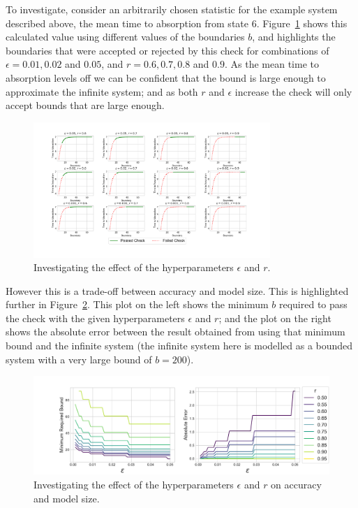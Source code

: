 \documentclass{article}
\begin{document}
To investigate, consider an arbitrarily chosen statistic for the example system
described above, the mean time to absorption from state 6.
Figure~\ref{fig:investigate_hyperparameters} shows this calculated value using
different values of the boundaries $b$, and highlights the boundaries that were
accepted or rejected by this check for combinations of $\epsilon = 0.01, 0.02$
and $0.05$, and $r = 0.6, 0.7, 0.8$ and $0.9$.
As the mean time to absorption levels off we can be confident that the bound is
large enough to approximate the infinite system; and as both $r$ and $\epsilon$
increase the check will only accept bounds that are large enough.

\begin{figure}
  \begin{center}
    \includegraphics[width=0.8\textwidth]{img/check_hyperparameters_effect.pdf}
  \end{center}
  \caption{Investigating the effect of the hyperparameters $\epsilon$ and $r$.}
  \label{fig:investigate_hyperparameters}
\end{figure}

However this is a trade-off between accuracy and model size.
This is highlighted further in Figure~\ref{fig:summary_hyperparameters}.
This plot on the left shows the minimum $b$ required to pass the check with the
given hyperparameters $\epsilon$ and $r$; and the plot on the right shows the
absolute error between the result obtained from using that minimum bound and the
infinite system (the infinite system here is modelled as a bounded system with a
very large bound of $b = 200$).

\begin{figure}
  \begin{center}
    \includegraphics[width=\textwidth]{img/check_hyperparameters_effect_summary.pdf}
  \end{center}
  \caption{Investigating the effect of the hyperparameters $\epsilon$ and $r$ on
  accuracy and model size.}
  \label{fig:summary_hyperparameters}
\end{figure}
\end{document}
